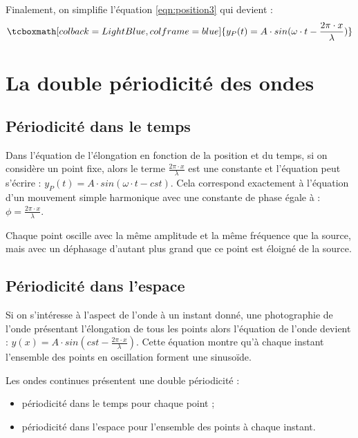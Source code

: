 Finalement, on simplifie l'équation \ref{eqn:position3} qui devient :
\begin{equation}
    \tcboxmath[colback=LightBlue,colframe=blue]{y_P (t)= A \cdot sin (\omega \cdot t- \frac{2 \pi  \cdot x}{\lambda})}
\end{equation}

\newpage

\section{La double périodicité des ondes}
\subsection{Périodicité dans le temps}
Dans l'équation de l'élongation en fonction de la position et du temps, si on considère un point fixe, alors le terme \(\frac{2 \pi \cdot x}{\lambda}\) est une constante et l'équation peut s'écrire : \(y_P (t) = A \cdot sin (\omega \cdot t- cst)\). Cela correspond exactement à l'équation d'un mouvement simple harmonique avec une constante de phase égale à : \(\phi = \frac{2 \pi \cdot x}{\lambda}\).

\begin{encadre}
    Chaque point oscille avec la même amplitude et la même fréquence que la source, mais avec un déphasage d'autant plus grand que ce point est éloigné de la source.
\end{encadre}

\subsection{Périodicité dans l'espace}
Si on s'intéresse à l'aspect de l'onde à un instant donné, une photographie de l'onde présentant l'élongation de tous les points alors l'équation de l'onde devient : \(y (x) = A \cdot sin (cst - \frac{2 \pi  \cdot x}{\lambda})\). Cette équation montre qu'à chaque instant l'ensemble des points en oscillation forment une sinusoïde.

\begin{encadre}
    Les ondes continues présentent une double périodicité :
    \begin{itemize}
        \item périodicité dans le temps pour chaque point ;
        \item périodicité dans l'espace pour l'ensemble des points à chaque instant.
    \end{itemize}
\end{encadre}

